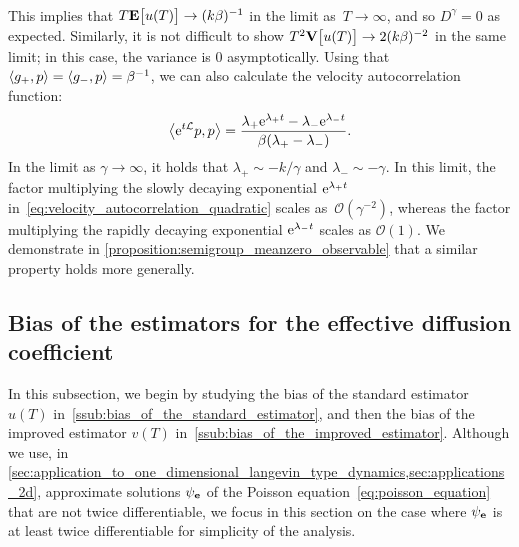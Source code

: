 \documentclass[11pt,a4paper]{article}
\begin{document}
\begin{example}
\begin{align*}
    \end{align*}
    This implies that
    \(
        T \mathbf{E} \bigl[ u(T) \bigr] \to (k \beta)^{-1}
    \)
    in the limit as~$T \to \infty$,
    and so $D^{\gamma} = 0$ as expected.
    Similarly, it is not difficult to show $T^2\mathbf{V} \bigl[ u(T) \bigr] \to 2 (k \beta)^{-2}$ in the same limit;
    in this case, the variance is 0 asymptotically.
    Using that $\ip{g_+}{p} = \ip{g_-}{p} = \beta^{-1}$,
    we can also calculate the velocity autocorrelation function:
    \begin{equation}
        \label{eq:velocity_autocorrelation_quadratic}
        \ip{\e^{t \mathcal L}p}{p} =
        \frac{\lambda_+ \e^{\lambda_+ t} - \lambda_- \e^{\lambda_- t}}{\beta(\lambda_+ - \lambda_-)}.
    \end{equation}
    In the limit as $\gamma \to \infty$,
    it holds that $\lambda_+ \sim - k/\gamma$ and $\lambda_- \sim - \gamma$.
    In this limit,
    the factor multiplying the slowly decaying exponential $\mathrm{e}^{\lambda_+ t}$ in~\eqref{eq:velocity_autocorrelation_quadratic} scales as~$\mathcal O(\gamma^{-2})$,
    whereas the factor multiplying the rapidly decaying exponential $\mathrm{e}^{\lambda_- t}$ scales as $\mathcal O(1)$.
    We demonstrate in \cref{proposition:semigroup_meanzero_observable} that a similar property holds more generally.
\end{example}

\subsection{Bias of the estimators for the effective diffusion coefficient}%
\label{sub:bias}

In this subsection,
we begin by studying the bias of the standard estimator $u(T)$ in~\cref{ssub:bias_of_the_standard_estimator},
and then the bias of the improved estimator $v(T)$ in~\cref{ssub:bias_of_the_improved_estimator}.
Although we use, in \cref{sec:application_to_one_dimensional_langevin_type_dynamics,sec:applications_2d},
approximate solutions $\psi_{\boldsymbol{\mathbf e}}$ of the Poisson equation~\eqref{eq:poisson_equation} that are not twice differentiable,
we focus in this section on the case where $\psi_{\boldsymbol{\mathbf e}}$ is at least twice differentiable for simplicity of the analysis.
\end{document}
